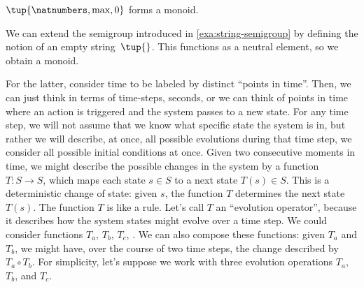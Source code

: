 \begin{example}
    $\tup{\natnumbers, \max,0}$ forms a monoid.
\end{example}




\begin{example}
    \label{exa:string-monoid}
    We can extend the semigroup introduced in \cref{exa:string-semigroup} by defining the notion of an empty string~$\tup{}$.
    This functions as a neutral element, so we obtain a monoid.
\end{example}


%
%
For the latter, consider time to be labeled by distinct ``points in time''.
Then, we can just think in terms of time-steps, \eg  seconds, or we can think of points in time where \eg  an action is triggered and the system passes to a new state.
%
For any time step, we will not assume that we know what specific state the system is in, but rather we will describe, at once, all possible evolutions during that time step, \ie  we consider all possible initial conditions at once.
Given two consecutive moments in time, we might describe the possible changes in the system by a function $T : S \rightarrow S$, which maps each state $s \in S$ to a next state $T(s) \in S$.
This is a deterministic change of state: given $s$, the function $T$ determines the next state $T(s)$.
The function $T$ is like a rule.
Let's call $T$ an ``evolution operator'', because it describes how the system states might evolve over a time step.
%
We could consider functions $T_a$, $T_b$, $T_c$, \etc.
We can also compose these functions: given $T_a$ and $T_b$, we might have, over the course of two time steps, the change described by $T_a \circ T_b$.
For simplicity, let's suppose we work with three evolution operations $T_a$, $T_b$, and $T_c$.
%
%
%
%
%

